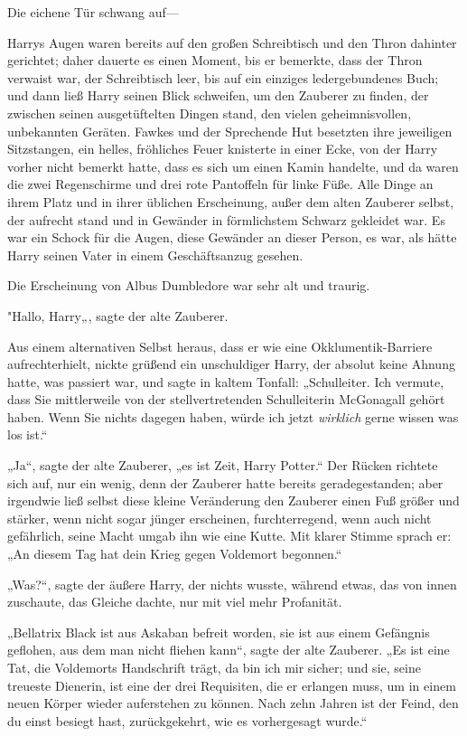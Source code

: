 {Die eichene Tür schwang auf—

Harrys Augen waren bereits auf den großen Schreibtisch und den Thron dahinter gerichtet; daher dauerte es einen Moment, bis er bemerkte, dass der Thron verwaist war, der Schreibtisch leer, bis auf ein einziges ledergebundenes Buch; und dann ließ Harry seinen Blick schweifen, um den Zauberer zu finden, der zwischen seinen ausgetüftelten Dingen stand, den vielen geheimnisvollen, unbekannten Geräten. Fawkes und der Sprechende Hut besetzten ihre jeweiligen Sitzstangen, ein helles, fröhliches Feuer knisterte in einer Ecke, von der Harry vorher nicht bemerkt hatte, dass es sich um einen Kamin handelte, und da waren die zwei Regenschirme und drei rote Pantoffeln für linke Füße. Alle Dinge an ihrem Platz und in ihrer üblichen Erscheinung, außer dem alten Zauberer selbst, der aufrecht stand und in Gewänder in förmlichstem Schwarz gekleidet war. Es war ein Schock für die Augen, diese Gewänder an dieser Person, es war, als hätte Harry seinen Vater in einem Geschäftsanzug gesehen.

Die Erscheinung von Albus Dumbledore war sehr alt und traurig.

"Hallo, Harry„, sagte der alte Zauberer.

Aus einem alternativen Selbst heraus, dass er wie eine Okklumentik-Barriere aufrechterhielt, nickte grüßend ein unschuldiger Harry, der absolut keine Ahnung hatte, was passiert war, und sagte in kaltem Tonfall: „Schulleiter. Ich vermute, dass Sie mittlerweile von der stellvertretenden Schulleiterin McGonagall gehört haben. Wenn Sie nichts dagegen haben, würde ich jetzt \emph{wirklich} gerne wissen was los ist.“

„Ja“, sagte der alte Zauberer, „es ist Zeit, Harry Potter.“ Der Rücken richtete sich auf, nur ein wenig, denn der Zauberer hatte bereits geradegestanden; aber irgendwie ließ selbst diese kleine Veränderung den Zauberer einen Fuß größer und stärker, wenn nicht sogar jünger erscheinen, furchterregend, wenn auch nicht gefährlich, seine Macht umgab ihn wie eine Kutte. Mit klarer Stimme sprach er: „An diesem Tag hat dein Krieg gegen Voldemort begonnen.“

„Was?“, sagte der äußere Harry, der nichts wusste, während etwas, das von innen zuschaute, das Gleiche dachte, nur mit viel mehr Profanität.

„Bellatrix Black ist aus Askaban befreit worden, sie ist aus einem Gefängnis geflohen, aus dem man nicht fliehen kann“, sagte der alte Zauberer. „Es ist eine Tat, die Voldemorts Handschrift trägt, da bin ich mir sicher; und sie, seine treueste Dienerin, ist eine der drei Requisiten, die er erlangen muss, um in einem neuen Körper wieder auferstehen zu können. Nach zehn Jahren ist der Feind, den du einst besiegt hast, zurückgekehrt, wie es vorhergesagt wurde.“

}
